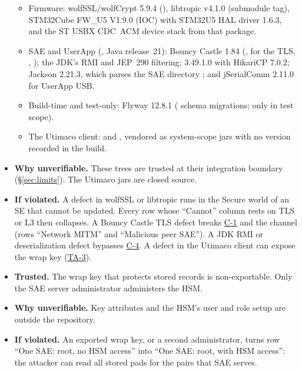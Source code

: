 \documentclass[11pt,a4paper]{article}
\begin{document}
\begin{description}[style=nextline,leftmargin=1.2em]
\begin{itemize}
  \begin{itemize}
  \item Firmware: wolfSSL/wolfCrypt 5.9.4 (), libtropic v4.1.0 (submodule tag), STM32Cube FW\_U5 V1.9.0 (IOC) with STM32U5 HAL driver 1.6.3, and the ST USBX CDC~ACM device stack from that package.
  \item SAE and UserApp (, Java release~21): Bouncy Castle 1.84 (,  for the  TLS, , ); the JDK's RMI and JEP~290 filtering;  3.49.1.0 with HikariCP 7.0.2; Jackson 2.21.3, which parses the SAE directory ; and jSerialComm 2.11.0 for UserApp USB.
  \item Build-time and test-only: Flyway 12.8.1 ( schema migrations;  only in test scope).
  \item The Utimaco client:  and , vendored as system-scope jars with no version recorded in the build.
  \end{itemize}
\item \textbf{Why unverifiable.} These trees are trusted at their integration boundary (\S\ref{sec:limits}). The Utimaco jars are closed source.
\item \textbf{If violated.} A defect in wolfSSL or libtropic runs in the Secure world of an SE that cannot be updated. Every row whose ``Cannot'' column rests on TLS or L3 then collapses. A Bouncy Castle TLS defect breaks \hyperref[c:C-1]{C-1} and the  channel (rows ``Network MITM'' and ``Malicious peer SAE''). A JDK RMI or deserialization defect bypasses \hyperref[c:C-4]{C-4}. A defect in the Utimaco client can expose the wrap key (\hyperref[ta:TA-3]{TA-3}).
\end{itemize}
\item[TA-3 Utimaco HSM]\label{ta:TA-3}
\begin{itemize}
\item \textbf{Trusted.} The wrap key that protects stored records is non-exportable. Only the SAE server administrator administers the HSM.
\item \textbf{Why unverifiable.} Key attributes and the HSM's user and role setup are outside the repository.
\item \textbf{If violated.} An exported wrap key, or a second administrator, turns row ``One SAE: root, no HSM access'' into ``One SAE: root, with HSM access'': the attacker can read all stored pads for the pairs that SAE serves.

\end{itemize}
\end{description}
\end{document}
